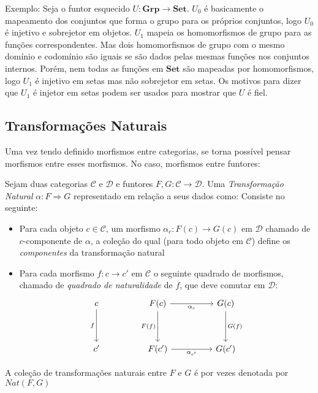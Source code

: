 \documentclass[../main.tex]{subfiles}
\begin{document}
Exemplo: Seja o funtor esquecido $U : \textbf{Grp} \to \textbf{Set}$. $U_0$ é basicamente o mapeamento dos conjuntos que forma o grupo para os próprios conjuntos, logo $U_0$ é injetivo e sobrejetor em objetos. $U_1$ mapeia os homomorfismos de grupo para as funções correspondentes. Mas dois homomorfismos de grupo com o mesmo domínio e codomínio são iguais se são dados pelas mesmas funções nos conjuntos internos. Porém, nem todas as funções em $\textbf{Set}$ são mapeadas por homomorfismos, logo $U_1$ é injetivo em setas mas não sobrejetor em setas. Os motivos para dizer que $U_1$ é injetor em setas podem ser usados para mostrar que $U$ é fiel. 

\subsection{Transformações Naturais}

Uma vez tendo definido morfismos entre categorias, se torna possível pensar morfismos entre esses morfismos. No caso, morfismos entre funtores:

\begin{definition}
    Sejam duas categorias $\mathcal{C}$ e $\mathcal{D}$ e funtores $F, G : \mathcal{C} \to \mathcal{D}$. Uma \emph{Transformação Natural} $\alpha : F \Rightarrow G$ representado em relação a seus dados como: 
    Consiste no seguinte:
    \begin{itemize}
        \item Para cada objeto $c \in \mathcal{C}$, um morfismo $\alpha_c : F(c) \to G(c)$ em $\mathcal{D}$ chamado de $c$-componente de $\alpha$, a coleção do qual (para todo objeto em $\mathcal{C}$) define os \emph{componentes} da transformação natural
        \item Para cada morfismo $f : c \to c'$ em $\mathcal{C}$ o seguinte quadrado de morfismos, chamado de \emph{quadrado de naturalidade} de $f$, que deve comutar em $\mathcal{D}$:
        \[\begin{tikzcd}
            c && {F(c)} && {G(c)} \\
            \\
            {c'} && {F(c')} && {G(c')}
            \arrow["f"', from=1-1, to=3-1]
            \arrow["{\alpha_{c}}"', from=1-3, to=1-5]
            \arrow["{F(f)}"', from=1-3, to=3-3]
            \arrow["{G(f)}", from=1-5, to=3-5]
            \arrow["{\alpha_{c'}}"', from=3-3, to=3-5]
        \end{tikzcd}\]
    \end{itemize}
    A coleção de transformações naturais entre $F$ e $G$ é por vezes denotada por $Nat(F, G)$
\end{definition}
\end{document}
